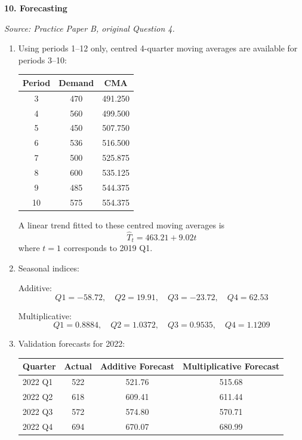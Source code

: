 \documentclass[11pt,a4paper]{article}
\begin{document}
\newpage

\textbf{10. Forecasting}

\textit{Source: Practice Paper B, original Question 4.}



\begin{enumerate}
\item Using periods 1--12 only, centred 4-quarter moving averages are available for periods 3--10:

\begin{center}
\begin{tabular}{ccc}
\toprule
Period & Demand & CMA \\
\midrule
3 & 470 & 491.250 \\
4 & 560 & 499.500 \\
5 & 450 & 507.750 \\
6 & 536 & 516.500 \\
7 & 500 & 525.875 \\
8 & 600 & 535.125 \\
9 & 485 & 544.375 \\
10 & 575 & 554.375 \\
\bottomrule
\end{tabular}
\end{center}

A linear trend fitted to these centred moving averages is
\[
\hat{T}_t = 463.21 + 9.02t
\]
where $t=1$ corresponds to 2019 Q1.

\item Seasonal indices:

Additive:
\[
Q1=-58.72,\quad Q2=19.91,\quad Q3=-23.72,\quad Q4=62.53
\]

Multiplicative:
\[
Q1=0.8884,\quad Q2=1.0372,\quad Q3=0.9535,\quad Q4=1.1209
\]

\item Validation forecasts for 2022:

\begin{center}
\begin{tabular}{lccc}
\toprule
Quarter & Actual & Additive Forecast & Multiplicative Forecast \\
\midrule
2022 Q1 & 522 & 521.76 & 515.68 \\
2022 Q2 & 618 & 609.41 & 611.44 \\
2022 Q3 & 572 & 574.80 & 570.71 \\
2022 Q4 & 694 & 670.07 & 680.99 \\
\bottomrule
\end{tabular}
\end{center}


\end{enumerate}
\end{document}
